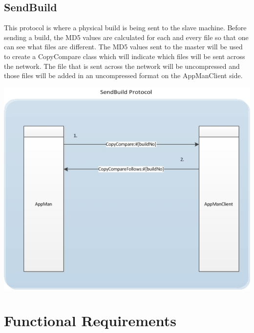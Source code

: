 \documentclass[a4paper,12pt,final]{article}
\begin{document}
\subsection{SendBuild}
This protocol is where a physical build is being sent to the slave machine. Before sending a build, the MD5 values are calculated for each and every file so that one can see what files are different. The MD5 values sent to the master will be used to create a CopyCompare class which will indicate which files will be sent across the network. The file that is sent across the network will be uncompressed and those files will be added in an uncompressed format on the AppManClient side.
\begin{center}
\includegraphics[scale=0.85]{CommunicationProtocol/SendBuildProtocol.jpg} 
\end{center}




\section{Functional Requirements}
\end{document}

